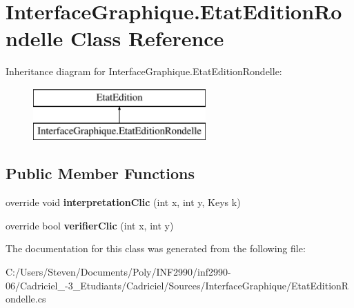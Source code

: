 \hypertarget{class_interface_graphique_1_1_etat_edition_rondelle}{}\section{Interface\+Graphique.\+Etat\+Edition\+Rondelle Class Reference}
\label{class_interface_graphique_1_1_etat_edition_rondelle}
Inheritance diagram for Interface\+Graphique.\+Etat\+Edition\+Rondelle\+:\begin{figure}[H]
\begin{center}
\leavevmode
\includegraphics[height=2.000000cm]{class_interface_graphique_1_1_etat_edition_rondelle}
\end{center}
\end{figure}
\subsection*{Public Member Functions}
\begin{DoxyCompactItemize}
\item 
\hypertarget{class_interface_graphique_1_1_etat_edition_rondelle_a33e725c3e9db6f9c822bbe75ab9328c5}{}\label{class_interface_graphique_1_1_etat_edition_rondelle_a33e725c3e9db6f9c822bbe75ab9328c5} 
override void {\bfseries interpretation\+Clic} (int x, int y, Keys k)
\item 
\hypertarget{class_interface_graphique_1_1_etat_edition_rondelle_ab7559d67e73d6055184a503025ea7456}{}\label{class_interface_graphique_1_1_etat_edition_rondelle_ab7559d67e73d6055184a503025ea7456} 
override bool {\bfseries verifier\+Clic} (int x, int y)
\end{DoxyCompactItemize}


The documentation for this class was generated from the following file\+:\begin{DoxyCompactItemize}
\item 
C\+:/\+Users/\+Steven/\+Documents/\+Poly/\+I\+N\+F2990/inf2990-\/06/\+Cadriciel\+\_-\/3\+\_\+\+Etudiants/\+Cadriciel/\+Sources/\+Interface\+Graphique/Etat\+Edition\+Rondelle.\+cs\end{DoxyCompactItemize}
